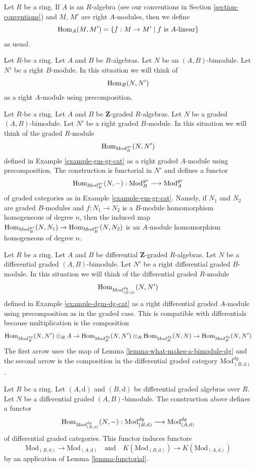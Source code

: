 \noindent
Let $R$ be a ring. If $A$ is an $R$-algebra (see our conventions
in Section \ref{section-conventions}) and $M$, $M'$ are right
$A$-modules, then we define
$$
\mathop{\mathrm{Hom}}\nolimits_A(M, M') = \{f : M \to M' \mid f \text{ is }A\text{-linear}\}
$$
as usual.

\medskip\noindent
Let $R$-be a ring. Let $A$ and $B$ be $R$-algebras. Let
$N$ be an $(A, B)$-bimodule. Let $N'$ be a right $B$-module.
In this situation we will think of
$$
\mathop{\mathrm{Hom}}\nolimits_B(N, N')
$$
as a right $A$-module using precomposition.

\medskip\noindent
Let $R$-be a ring. Let $A$ and $B$ be $\mathbf{Z}$-graded $R$-algebras. Let
$N$ be a graded $(A, B)$-bimodule. Let $N'$ be a right graded $B$-module.
In this situation we will think of the graded $R$-module
$$
\mathop{\mathrm{Hom}}\nolimits_{\text{Mod}^{gr}_B}(N, N')
$$
defined in Example \ref{example-gm-gr-cat} as a right graded $A$-module
using precomposition. The construction is functorial in $N'$ and defines
a functor
$$
\mathop{\mathrm{Hom}}\nolimits_{\text{Mod}^{gr}_B}(N, -) :
\text{Mod}^{gr}_B
\longrightarrow
\text{Mod}^{gr}_A
$$
of graded categories as in Example \ref{example-gm-gr-cat}. Namely, if
$N_1$ and $N_2$ are graded $B$-modules and $f : N_1 \to N_2$ is a $B$-module
homomorphism homogeneous of degree $n$, then the induced map
$\mathop{\mathrm{Hom}}\nolimits_{\text{Mod}^{gr}_B}(N, N_1) \to \mathop{\mathrm{Hom}}\nolimits_{\text{Mod}^{gr}_B}(N, N_2)$
is an $A$-module homomorphism homogeneous of degree $n$.

\medskip\noindent
Let $R$ be a ring. Let $A$ and $B$ be differential $\mathbf{Z}$-graded
$R$-algebras. Let $N$ be a differential graded $(A, B)$-bimodule.
Let $N'$ be a right differential graded $B$-module. In this situation
we will think of the differential graded $R$-module
$$
\mathop{\mathrm{Hom}}\nolimits_{\text{Mod}^{dg}_{(B, \text{d})}}(N, N')
$$
defined in Example \ref{example-dgm-dg-cat} as a right differential
graded $A$-module using precomposition as in the graded case. This
is compatible with differentials because multiplication is the
composition
$$
\mathop{\mathrm{Hom}}\nolimits_{\text{Mod}^{dg}_B}(N, N') \otimes_R A \to
\mathop{\mathrm{Hom}}\nolimits_{\text{Mod}^{dg}_B}(N, N') \otimes_R
\mathop{\mathrm{Hom}}\nolimits_{\text{Mod}^{dg}_B}(N, N) \to
\mathop{\mathrm{Hom}}\nolimits_{\text{Mod}^{dg}_B}(N, N')
$$
The first arrow uses the map
of Lemma \ref{lemma-what-makes-a-bimodule-dg} and the second
arrow is the composition in the differential graded category
$\text{Mod}^{dg}_{(B, \text{d})}$.

\begin{lemma}
\label{lemma-hom}
Let $R$ be a ring. Let $(A, \text{d})$ and $(B, \text{d})$
be differential graded algebras over $R$. Let $N$ be a
differential graded $(A, B)$-bimodule. The construction above
defines a functor
$$
\mathop{\mathrm{Hom}}\nolimits_{\text{Mod}^{dg}_{(B, \text{d})}}(N, -) :
\text{Mod}^{dg}_{(B, \text{d})}
\longrightarrow
\text{Mod}^{dg}_{(A, \text{d})}
$$
of differential graded categories. This functor induces functors
$$
\text{Mod}_{(B, \text{d})} \to \text{Mod}_{(A, \text{d})}
\quad\text{and}\quad
K(\text{Mod}_{(B, \text{d})}) \to K(\text{Mod}_{(A, \text{d})})
$$
by an application of Lemma \ref{lemma-functorial}.
\end{lemma}

